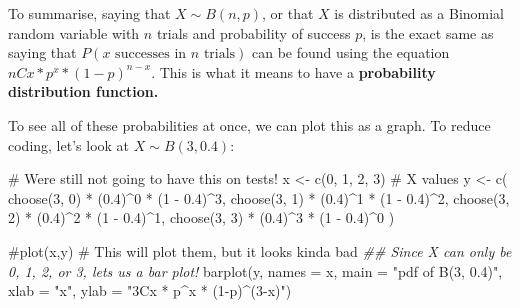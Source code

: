 \documentclass[
  letterpaper,
  DIV=11,
  numbers=noendperiod,
  oneside]{scrreprt}
\newenvironment{Shaded}{\begin{snugshade}}{\end{snugshade}}
\newcommand{\AttributeTok}[1]{\textcolor[rgb]{0.40,0.45,0.13}{#1}}
\newcommand{\CommentTok}[1]{\textcolor[rgb]{0.37,0.37,0.37}{#1}}
\newcommand{\DecValTok}[1]{\textcolor[rgb]{0.68,0.00,0.00}{#1}}
\newcommand{\DocumentationTok}[1]{\textcolor[rgb]{0.37,0.37,0.37}{\textit{#1}}}
\newcommand{\FloatTok}[1]{\textcolor[rgb]{0.68,0.00,0.00}{#1}}
\newcommand{\FunctionTok}[1]{\textcolor[rgb]{0.28,0.35,0.67}{#1}}
\newcommand{\NormalTok}[1]{\textcolor[rgb]{0.00,0.23,0.31}{#1}}
\newcommand{\OtherTok}[1]{\textcolor[rgb]{0.00,0.23,0.31}{#1}}
\newcommand{\SpecialCharTok}[1]{\textcolor[rgb]{0.37,0.37,0.37}{#1}}
\newcommand{\StringTok}[1]{\textcolor[rgb]{0.13,0.47,0.30}{#1}}
\begin{document}
To summarise, saying that \(X \sim B(n,p)\), or that \(X\) is
distributed as a Binomial random variable with \(n\) trials and
probability of success \(p\), is the exact same as saying that
\(P(x\text{ successes in }n\text{ trials})\) can be found using the
equation \(nCx*p^x*(1-p)^{n-x}\). This is what it means to have a
\textbf{probability distribution function.}

To see all of these probabilities at once, we can plot this as a graph.
To reduce coding, let's look at \(X\sim B(3, 0.4)\):

\begin{Shaded}
\begin{Highlighting}[]
\CommentTok{\# We\textquotesingle{}re still not going to have this on tests!}
\NormalTok{x }\OtherTok{\textless{}{-}} \FunctionTok{c}\NormalTok{(}\DecValTok{0}\NormalTok{, }\DecValTok{1}\NormalTok{, }\DecValTok{2}\NormalTok{, }\DecValTok{3}\NormalTok{) }\CommentTok{\# X values}
\NormalTok{y }\OtherTok{\textless{}{-}} \FunctionTok{c}\NormalTok{(}
    \FunctionTok{choose}\NormalTok{(}\DecValTok{3}\NormalTok{, }\DecValTok{0}\NormalTok{) }\SpecialCharTok{*}\NormalTok{ (}\FloatTok{0.4}\NormalTok{)}\SpecialCharTok{\^{}}\DecValTok{0} \SpecialCharTok{*}\NormalTok{ (}\DecValTok{1} \SpecialCharTok{{-}} \FloatTok{0.4}\NormalTok{)}\SpecialCharTok{\^{}}\DecValTok{3}\NormalTok{,}
    \FunctionTok{choose}\NormalTok{(}\DecValTok{3}\NormalTok{, }\DecValTok{1}\NormalTok{) }\SpecialCharTok{*}\NormalTok{ (}\FloatTok{0.4}\NormalTok{)}\SpecialCharTok{\^{}}\DecValTok{1} \SpecialCharTok{*}\NormalTok{ (}\DecValTok{1} \SpecialCharTok{{-}} \FloatTok{0.4}\NormalTok{)}\SpecialCharTok{\^{}}\DecValTok{2}\NormalTok{,}
    \FunctionTok{choose}\NormalTok{(}\DecValTok{3}\NormalTok{, }\DecValTok{2}\NormalTok{) }\SpecialCharTok{*}\NormalTok{ (}\FloatTok{0.4}\NormalTok{)}\SpecialCharTok{\^{}}\DecValTok{2} \SpecialCharTok{*}\NormalTok{ (}\DecValTok{1} \SpecialCharTok{{-}} \FloatTok{0.4}\NormalTok{)}\SpecialCharTok{\^{}}\DecValTok{1}\NormalTok{,}
    \FunctionTok{choose}\NormalTok{(}\DecValTok{3}\NormalTok{, }\DecValTok{3}\NormalTok{) }\SpecialCharTok{*}\NormalTok{ (}\FloatTok{0.4}\NormalTok{)}\SpecialCharTok{\^{}}\DecValTok{3} \SpecialCharTok{*}\NormalTok{ (}\DecValTok{1} \SpecialCharTok{{-}} \FloatTok{0.4}\NormalTok{)}\SpecialCharTok{\^{}}\DecValTok{0}
\NormalTok{)}

\CommentTok{\#plot(x,y) \# This will plot them, but it looks kinda bad}
\DocumentationTok{\#\# Since X can only be 0, 1, 2, or 3, let\textquotesingle{}s us a bar plot!}
\FunctionTok{barplot}\NormalTok{(y, }\AttributeTok{names =}\NormalTok{ x,}
  \AttributeTok{main =} \StringTok{"pdf of B(3, 0.4)"}\NormalTok{, }\AttributeTok{xlab =} \StringTok{"x"}\NormalTok{,}
  \AttributeTok{ylab =} \StringTok{"3Cx * p\^{}x * (1{-}p)\^{}(3{-}x)"}\NormalTok{)}
\end{Highlighting}
\end{Shaded}
\end{document}
